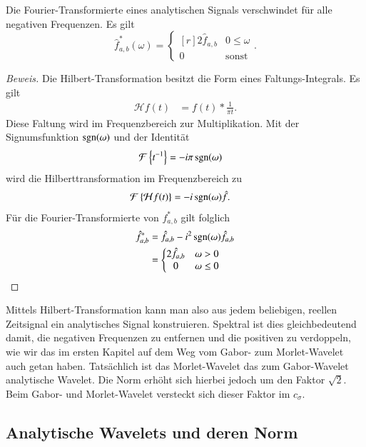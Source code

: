 \begin{refsection}
\begin{satz}
	Die Fourier-Transformierte eines analytischen Signals verschwindet für alle negativen Frequenzen.
	Es gilt
	\[
		\hat{f}^\ast_{a,b}(\omega) = \left\lbrace\begin{matrix*}[r]	
			2\hat{f}_{a,b} & 0 \le \omega \\ 0 & \text{sonst}\end{matrix*} \right..
	\]
\end{satz}

\begin{proof}[Beweis]
	Die Hilbert-Transformation besitzt die Form eines Faltungs-Integrals.
	Es gilt
	\begin{align*}
		\mathcal{H} f(t) &= f(t) * \frac{1}{\pi t}.
	\end{align*}
	Diese Faltung wird im Frequenzbereich zur Multiplikation.
	Mit der Signumsfunktion $\sgn(\omega)$ und der Identität
	\begin{align*}
		\mathcal{F} \left\lbrace t^{-1}\right\rbrace  &= -i\pi\sgn(\omega)
	\end{align*}
	wird die Hilberttransformation im Frequenzbereich zu
	\begin{align*}
		\mathcal{F}\left\lbrace \mathcal{H}f(t)\right\rbrace 
		&= -i\sgn(\omega) \hat{f}.
	\end{align*}
	Für die Fourier-Transformierte von $f^\ast_{a,b}$ gilt folglich 
	\begin{align*}
		\hat{f}^\ast_{a,b} 
		&= \hat{f}_{a,b} - i^2\sgn(\omega)\hat{f}_{a,b}\\
		&=\left\lbrace\begin{matrix}
			2\hat{f}_{a,b} & \omega > 0\\
			0 & \omega \le 0
		\end{matrix} \right.
	\end{align*}
\end{proof}

Mittels Hilbert-Transformation kann man also aus jedem beliebigen, reellen Zeitsignal ein analytisches Signal konstruieren.
Spektral ist dies gleichbedeutend damit, die negativen Frequenzen zu entfernen und die positiven zu verdoppeln, wie wir das im ersten Kapitel auf dem Weg vom Gabor- zum Morlet-Wavelet auch getan haben.
Tatsächlich ist das Morlet-Wavelet das zum Gabor-Wavelet analytische Wavelet.
Die Norm erhöht sich hierbei jedoch um den Faktor $\sqrt{2}$.
Beim Gabor- und Morlet-Wavelet versteckt sich dieser Faktor im $c_\sigma$.

\subsection{Analytische Wavelets und deren Norm}


\end{refsection}
